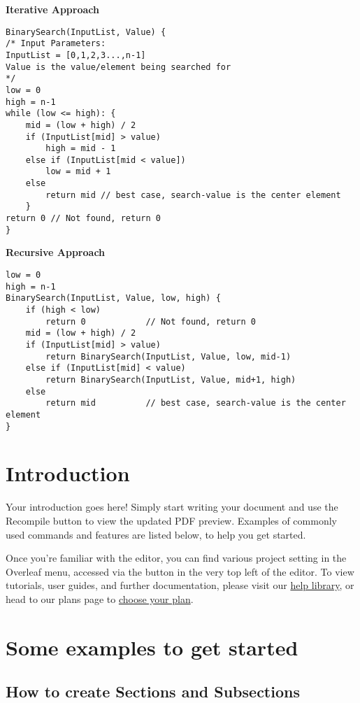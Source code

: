 \documentclass{article}
\begin{document}
\textbf{Iterative Approach}
\begin{lstlisting}
BinarySearch(InputList, Value) {
/* Input Parameters:
InputList = [0,1,2,3...,n-1]
Value is the value/element being searched for
*/
low = 0
high = n-1
while (low <= high): {
    mid = (low + high) / 2
    if (InputList[mid] > value)
        high = mid - 1
    else if (InputList[mid < value])
        low = mid + 1
    else 
        return mid // best case, search-value is the center element
    }
return 0 // Not found, return 0
}
\end{lstlisting}

\textbf{Recursive Approach}
\begin{lstlisting}
low = 0
high = n-1
BinarySearch(InputList, Value, low, high) {
    if (high < low)
        return 0            // Not found, return 0
    mid = (low + high) / 2
    if (InputList[mid] > value)
        return BinarySearch(InputList, Value, low, mid-1)
    else if (InputList[mid] < value)
        return BinarySearch(InputList, Value, mid+1, high)
    else 
        return mid          // best case, search-value is the center element
}
\end{lstlisting}

\iffalse
\section{Introduction}

Your introduction goes here! Simply start writing your document and use the Recompile button to view the updated PDF preview. Examples of commonly used commands and features are listed below, to help you get started.

Once you're familiar with the editor, you can find various project setting in the Overleaf menu, accessed via the button in the very top left of the editor. To view tutorials, user guides, and further documentation, please visit our \href{https://www.overleaf.com/learn}{help library}, or head to our plans page to \href{https://www.overleaf.com/user/subscription/plans}{choose your plan}.

\section{Some examples to get started}

\subsection{How to create Sections and Subsections}
\end{document}
